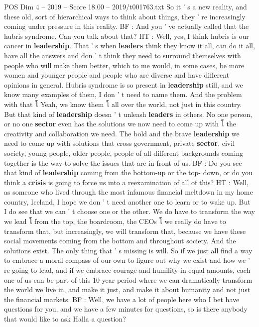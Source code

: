 \begin{textsample}{POS Dim 4 – 2019 – Score 18.00 – 2019/t001763.txt}
So it ' s a new reality, and these old, sort of hierarchical ways to think about things, they ' re increasingly coming under pressure in this reality.
BF : And you ' ve actually called that the hubris syndrome.
Can you talk about that?
HT : Well, yes, I think hubris is our cancer in \textbf{leadership}.
That ' s when \textbf{leaders} think they know it all, can do it all, have all the answers and don ' t think they need to surround themselves with people who will make them better, which to me would, in some cases, be more women and younger people and people who are diverse and have different opinions in general.
Hubris syndrome is so present in \textbf{leadership} still, and we know many examples of them, I don ' t need to name them.
And the problem with that โ Yeah, we know them โ all over the world, not just in this country.
But that kind of \textbf{leadership} doesn ' t unleash \textbf{leaders} in others.
No one person, or no one \textbf{sector} even has the solutions we now need to come up with โ the creativity and collaboration we need.
The bold and the brave \textbf{leadership} we need to come up with solutions that cross government, private \textbf{sector}, civil society, young people, older people, people of all different backgrounds coming together is the way to solve the issues that are in front of us.
BF : Do you see that kind of \textbf{leadership} coming from the bottom-up or the top- down, or do you think a \textbf{crisis} is going to force us into a reexamination of all of this?
HT : Well, as someone who lived through the most infamous financial meltdown in my home country, Iceland, I hope we don ' t need another one to learn or to wake up.
But I do see that we can ' t choose one or the other.
We do have to transform the way we lead โ from the top, the boardroom, the CEOs โ we really do have to transform that, but increasingly, we will transform that, because we have these social movements coming from the bottom and throughout society.
And the solutions exist.
The only thing that ' s missing is will.
So if we just all find a way to embrace a moral compass of our own to figure out why we exist and how we ' re going to lead, and if we embrace courage and humility in equal amounts, each one of us can be part of this 10-year period where we can dramatically transform the world we live in, and make it just, and make it about humanity and not just the financial markets.
BF : Well, we have a lot of people here who I bet have questions for you, and we have a few minutes for questions, so is there anybody that would like to ask Halla a question?

\end{textsample}
